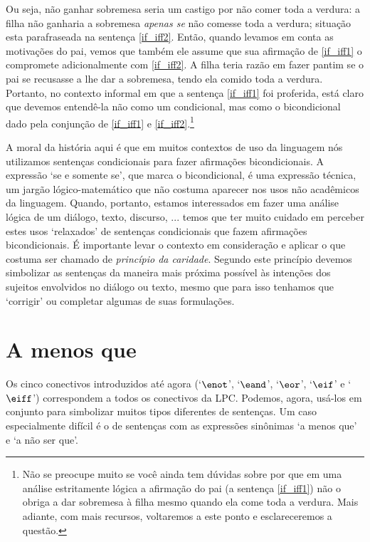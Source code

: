 Ou seja, não ganhar sobremesa seria um castigo por não comer toda a verdura:
a filha não ganharia a sobremesa \emph{apenas se} não comesse toda a verdura; situação esta parafraseada na sentença \ref{if_iff2}.
Então, quando levamos em conta as motivações do pai, vemos que também ele assume que sua afirmação de \ref{if_iff1} o compromete adicionalmente com \ref{if_iff2}.
A filha teria razão em fazer pantim se o pai se recusasse a lhe dar a sobremesa, tendo ela comido toda a verdura.
Portanto, no contexto informal em que a sentença \ref{if_iff1} foi proferida, está claro que devemos entendê-la não como um condicional, mas como o bicondicional dado pela conjunção de \ref{if_iff1} e \ref{if_iff2}.\footnote{
	Não se preocupe muito se você ainda tem dúvidas sobre por que em uma análise estritamente lógica a afirmação do pai (a sentença \ref{if_iff1}) não o obriga a dar sobremesa à filha mesmo quando ela come toda a verdura.
	Mais adiante, com mais recursos, voltaremos a este ponto e esclareceremos a questão.}

A moral da história aqui é que em muitos contextos de uso da linguagem nós utilizamos sentenças condicionais para fazer afirmações bicondicionais.
A expressão `se e somente se', que marca o bicondicional, é uma expressão técnica, um jargão lógico-matemático que não costuma aparecer nos usos não acadêmicos da linguagem.
Quando, portanto, estamos interessados em fazer uma análise lógica de um diálogo, texto, discurso, ... temos que ter muito cuidado em perceber estes usos `relaxados' de sentenças condicionais que fazem afirmações bicondicionais.
É importante levar o contexto em consideração e aplicar o que costuma ser chamado de  \emph{princípio da caridade}.
Segundo este princípio devemos simbolizar as sentenças da maneira mais próxima possível às intenções dos sujeitos envolvidos no diálogo ou texto, mesmo que para isso tenhamos que `corrigir' ou completar algumas de suas formulações.


\section{A menos que}
Os cinco conectivos introduzidos até agora (`$\enot$', `$\eand$', `$\eor$', `$\eif$' e `$\eiff$') correspondem a todos os conectivos da LPC.
Podemos, agora, usá-los em conjunto para simbolizar muitos tipos diferentes de sentenças.
Um caso especialmente difícil é o de sentenças com as expressões sinônimas  `a menos que' e `a não ser que'.

